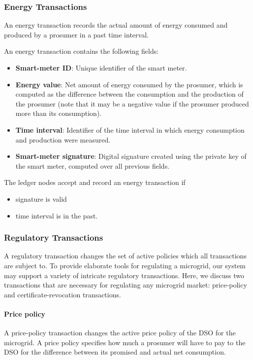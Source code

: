 \documentclass[chi_draft]{sigchi}
\begin{document}
\subsubsection{Energy Transactions}
An energy transaction records the actual amount of energy consumed and produced by a prosumer in a past time interval.

An energy transaction contains the following fields:
\begin{itemize}
\item \textbf{Smart-meter ID}: Unique identifier of the smart meter.
\item \textbf{Energy value}: Net amount of energy consumed by the prosumer, which is computed as the difference between the consumption and the production of the prosumer (note that it may be a negative value if the prosumer produced more than its consumption).
\item \textbf{Time interval}: Identifier of the time interval in which energy consumption and production were measured.
\item \textbf{Smart-meter signature}: Digital signature created using the private key of the smart meter, computed over all previous fields.
\end{itemize}

The ledger nodes accept and record an energy transaction if
\begin{itemize}
\item signature is valid
\item time interval is in the past.
\end{itemize}

\subsubsection{Regulatory Transactions}
A regulatory transaction changes the set of active policies which all transactions are subject to.
To provide elaborate tools for regulating a microgrid, our system may support a variety of intricate regulatory transactions.
Here, we discuss two transactions that are necessary for regulating any microgrid market: price-policy and certificate-revocation transactions.

\paragraph{Price policy}
A price-policy transaction changes the active price policy of the DSO for the microgrid.
A price policy specifies how much a prosumer will have to pay to the DSO for the difference between its promised and actual net consumption.
\end{document}
